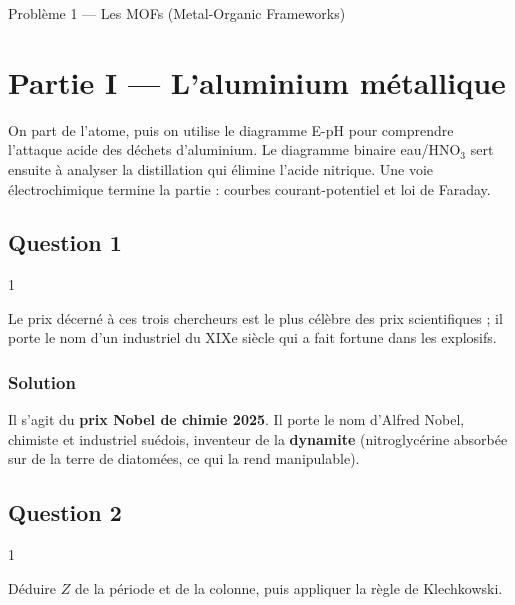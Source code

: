 \documentclass[11pt,a4paper]{article}
\begin{document}
Problème 1 --- Les MOFs (Metal-Organic Frameworks)

\hypertarget{partie-i-laluminium-muxe9tallique}{%
\section{Partie I --- L'aluminium métallique}\label{partie-i-laluminium-muxe9tallique}}

On part de l'atome, puis on utilise le diagramme E-pH pour comprendre l'attaque acide des déchets d'aluminium. Le diagramme binaire eau/HNO\(_3\) sert ensuite à analyser la distillation qui élimine l'acide nitrique. Une voie électrochimique termine la partie : courbes courant-potentiel et loi de Faraday.

\hypertarget{question-1}{%
\subsection{Question 1}\label{question-1}}

\begin{indication}{1}

Le prix décerné à ces trois chercheurs est le plus célèbre des prix scientifiques ; il porte le nom d'un industriel du XIXe siècle qui a fait fortune dans les explosifs.

\end{indication}

\hypertarget{solution}{%
\subsubsection{Solution}\label{solution}}

Il s'agit du \textbf{prix Nobel de chimie 2025}. Il porte le nom d'Alfred Nobel, chimiste et industriel suédois, inventeur de la \textbf{dynamite} (nitroglycérine absorbée sur de la terre de diatomées, ce qui la rend manipulable).

\hypertarget{question-2}{%
\subsection{Question 2}\label{question-2}}

\begin{indication}{1}

Déduire \(Z\) de la période et de la colonne, puis appliquer la règle de Klechkowski.

\end{indication}
\end{document}
